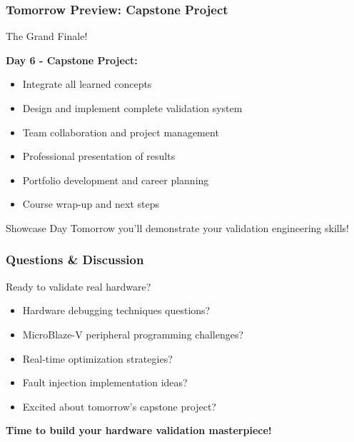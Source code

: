 \documentclass{beamer}
\begin{document}
\begin{frame}
\frametitle{Tomorrow Preview: Capstone Project}
\begin{center}
\Large The Grand Finale!
\end{center}

\textbf{Day 6 - Capstone Project:}
\begin{itemize}
    \item Integrate all learned concepts
    \item Design and implement complete validation system
    \item Team collaboration and project management
    \item Professional presentation of results
    \item Portfolio development and career planning
    \item Course wrap-up and next steps
\end{itemize}

\vspace{0.5cm}
\begin{alertblock}{Showcase Day}
Tomorrow you'll demonstrate your validation engineering skills!
\end{alertblock}
\end{frame}

\begin{frame}
\frametitle{Questions \& Discussion}
\begin{center}
\Large Ready to validate real hardware?
\end{center}

\begin{itemize}
    \item Hardware debugging techniques questions?
    \item MicroBlaze-V peripheral programming challenges?
    \item Real-time optimization strategies?
    \item Fault injection implementation ideas?
    \item Excited about tomorrow's capstone project?
\end{itemize}

\vspace{1cm}
\begin{center}
\textbf{Time to build your hardware validation masterpiece!}
\end{center}
\end{frame}
\end{document}
